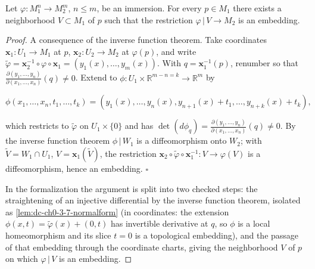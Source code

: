 \begin{proposition}
  \label{prop:dc-ch0-3-7}
  \leanok
  Let $\varphi:M_1^n\to M_2^m$, $n\le m$, be an immersion. For every $p\in M_1$
  there exists a neighborhood $V\subset M_1$ of $p$ such that the restriction
  $\varphi\,|\,V\to M_2$ is an embedding.
\end{proposition}
\begin{proof}
  \leanok
  A consequence of the inverse function theorem. Take coordinates
  $\mathbf{x}_1:U_1\to M_1$ at $p$, $\mathbf{x}_2:U_2\to M_2$ at $\varphi(p)$, and
  write $\tilde\varphi=\mathbf{x}_2^{-1}\circ\varphi\circ\mathbf{x}_1=(y_1(x),\dots,y_m(x))$.
  With $q=\mathbf{x}_1^{-1}(p)$, renumber so that
  $\frac{\partial(y_1,\dots,y_n)}{\partial(x_1,\dots,x_n)}(q)\neq0$. Extend to
  $\phi:U_1\times\mathbb{R}^{m-n=k}\to\mathbb{R}^m$ by
  
  $$
  \phi(x_1,\dots,x_n,t_1,\dots,t_k)=(y_1(x),\dots,y_n(x),y_{n+1}(x)+t_1,\dots,y_{n+k}(x)+t_k),
  $$
  
  which restricts to $\tilde\varphi$ on $U_1\times\{0\}$ and has
  $\det(d\phi_q)=\frac{\partial(y_1,\dots,y_n)}{\partial(x_1,\dots,x_n)}(q)\neq0$. By
  the inverse function theorem $\phi\,|\,W_1$ is a diffeomorphism onto $W_2$; with
  $\tilde V=W_1\cap U_1$, $V=\mathbf{x}_1(\tilde V)$, the restriction
  $\mathbf{x}_2\circ\tilde\varphi\circ\mathbf{x}_1^{-1}:V\to\varphi(V)$ is a
  diffeomorphism, hence an embedding. $\square$

  In the formalization the argument is split into two checked steps: the straightening of an
  injective differential by the inverse function theorem, isolated as
  \cref{lem:dc-ch0-3-7-normalform} (in coordinates: the extension
  $\phi(x,t)=\tilde\varphi(x)+(0,t)$ has invertible derivative at $q$, so $\phi$ is a local
  homeomorphism and its slice $t=0$ is a topological embedding), and the passage of that
  embedding through the coordinate charts, giving the neighborhood $V$ of $p$ on which
  $\varphi\,|\,V$ is an embedding.
\end{proof}


